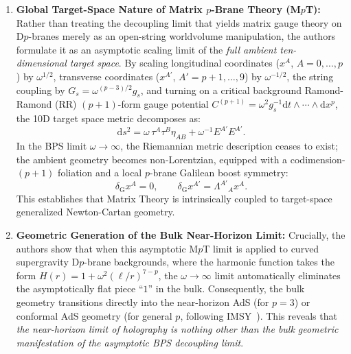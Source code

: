 \documentclass[11pt,a4paper]{article}
\newcommand{\dd}{\mathrm{d}}
\begin{document}
\begin{enumerate}
    \item \textbf{Global Target-Space Nature of Matrix $p$-Brane Theory (M$p$T):}
    Rather than treating the decoupling limit that yields matrix gauge theory on D$p$-branes merely as an open-string worldvolume manipulation, the authors formulate it as an asymptotic scaling limit of the \emph{full ambient ten-dimensional target space}. By scaling longitudinal coordinates ($x^A$, $A=0,\dots,p$) by $\omega^{1/2}$, transverse coordinates ($x^{A'}$, $A'=p+1,\dots,9$) by $\omega^{-1/2}$, the string coupling by $G_s = \omega^{(p-3)/2} g_s$, and turning on a critical background Ramond-Ramond (RR) $(p+1)$-form gauge potential $C^{(p+1)} = \omega^2 g_s^{-1} \dd t \wedge \cdots \wedge \dd x^p$, the 10D target space metric decomposes as:
    \begin{equation}
        \dd s^2 = \omega \, \tau^A \tau^B \eta_{AB} + \omega^{-1} E^{A'} E^{A'}.
    \end{equation}
    In the BPS limit $\omega \to \infty$, the Riemannian metric description ceases to exist; the ambient geometry becomes non-Lorentzian, equipped with a codimension-$(p+1)$ foliation and a local $p$-brane Galilean boost symmetry:
    \begin{equation}
        \delta_{\text{G}} x^A = 0, \qquad \delta_{\text{G}} x^{A'} = \Lambda^{A'}{}_A x^A.
    \end{equation}
    This establishes that Matrix Theory is intrinsically coupled to target-space generalized Newton-Cartan geometry.

    \item \textbf{Geometric Generation of the Bulk Near-Horizon Limit:}
    Crucially, the authors show that when this asymptotic M$p$T limit is applied to curved supergravity D$p$-brane backgrounds, where the harmonic function takes the form $H(r) = 1 + \omega^2 (\ell/r)^{7-p}$, the $\omega \to \infty$ limit automatically eliminates the asymptotically flat piece ``$1$'' in the bulk. Consequently, the bulk geometry transitions directly into the near-horizon AdS (for $p=3$) or conformal AdS geometry (for general $p$, following IMSY~\cite{Itzhaki:1998dd}). This reveals that \emph{the near-horizon limit of holography is nothing other than the bulk geometric manifestation of the asymptotic BPS decoupling limit}.


\end{enumerate}
\end{document}
